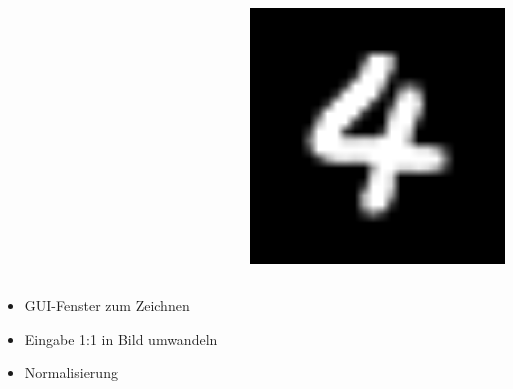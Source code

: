 \documentclass[xcolor=pdftex,dvipsnames,table]{beamer}
\begin{document}
\begin{frame}
\begin{columns}
\begin{column}{0.05\textwidth}
		\end{column}
		\begin{column}{0.25\textwidth}
			\includegraphics[width=1\textwidth]{4_normalized.png}
		\end{column}
	\end{columns}
	\LARGE
	\begin{itemize}
		\item GUI-Fenster zum Zeichnen
		\item Eingabe 1:1 in Bild umwandeln
		\item Normalisierung
	\end{itemize}

\end{frame}
\end{document}

